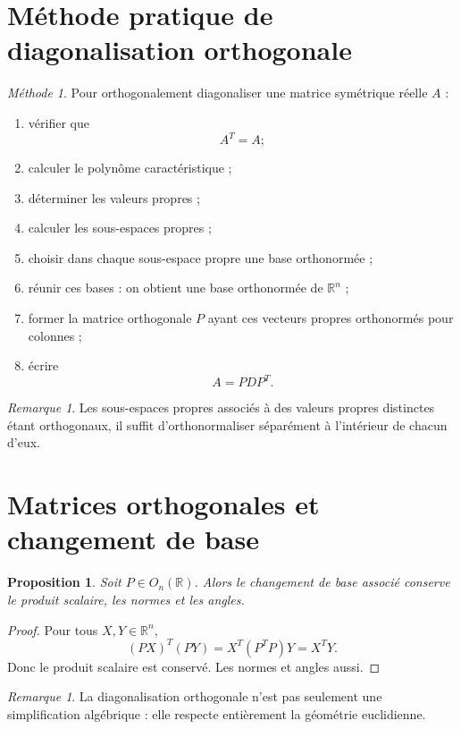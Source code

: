\documentclass[11pt,a4paper]{article}
\newtheorem{proposition}[definition]{Proposition}
\theoremstyle{remark}
\newtheorem{remarque}[definition]{Remarque}
\newtheorem*{methode}{Méthode}
\newcommand{\R}{\mathbb{R}}
\begin{document}
\section{Méthode pratique de diagonalisation orthogonale}

\begin{methode}
Pour orthogonalement diagonaliser une matrice symétrique réelle \(A\) :
\begin{enumerate}[label=\arabic*)]
    \item vérifier que
    \[
    A^T=A ;
    \]
    \item calculer le polynôme caractéristique ;
    \item déterminer les valeurs propres ;
    \item calculer les sous-espaces propres ;
    \item choisir dans chaque sous-espace propre une base orthonormée ;
    \item réunir ces bases : on obtient une base orthonormée de \(\R^n\) ;
    \item former la matrice orthogonale \(P\) ayant ces vecteurs propres orthonormés pour colonnes ;
    \item écrire
    \[
    A=PDP^T.
    \]
\end{enumerate}
\end{methode}

\begin{remarque}
Les sous-espaces propres associés à des valeurs propres distinctes étant orthogonaux, il suffit d’orthonormaliser séparément à l’intérieur de chacun d’eux.
\end{remarque}

\section{Matrices orthogonales et changement de base}

\begin{proposition}
Soit \(P\in O_n(\R)\). Alors le changement de base associé conserve le produit scalaire, les normes et les angles.
\end{proposition}

\begin{proof}
Pour tous \(X,Y\in\R^n\),
\[
(PX)^T(PY)=X^T(P^TP)Y=X^TY.
\]
Donc le produit scalaire est conservé. Les normes et angles aussi.
\end{proof}

\begin{remarque}
La diagonalisation orthogonale n’est pas seulement une simplification algébrique : elle respecte entièrement la géométrie euclidienne.
\end{remarque}
\end{document}
